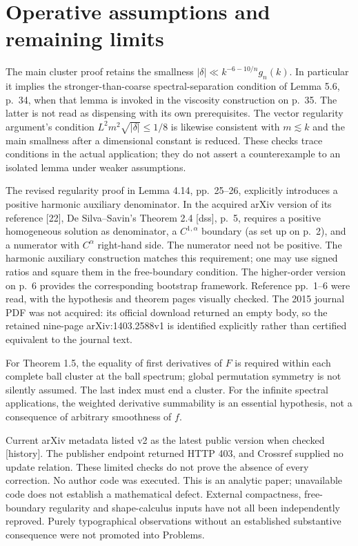 \documentclass[10pt]{article}
\begin{document}
\section*{Operative assumptions and remaining limits}
The main cluster proof retains the smallness \(|\delta|\ll k^{-6-10/n}g_n(k)\). In particular it implies the stronger-than-coarse spectral-separation condition of Lemma 5.6, p. 34, when that lemma is invoked in the viscosity construction on p. 35. The latter is not read as dispensing with its own prerequisites. The vector regularity argument’s condition \(L^2m^2\sqrt{|\delta|}\leq1/8\) is likewise consistent with \(m\lesssim k\) and the main smallness after a dimensional constant is reduced. These checks trace conditions in the actual application; they do not assert a counterexample to an isolated lemma under weaker assumptions.\par
The revised regularity proof in Lemma 4.14, pp. 25–26, explicitly introduces a positive harmonic auxiliary denominator. In the acquired arXiv version of its reference [22], De Silva–Savin’s Theorem 2.4 [dss], p. 5, requires a positive homogeneous solution as denominator, a \(C^{1,\alpha}\) boundary (as set up on p. 2), and a numerator with \(C^\alpha\) right-hand side. The numerator need not be positive. The harmonic auxiliary construction matches this requirement; one may use signed ratios and square them in the free-boundary condition. The higher-order version on p. 6 provides the corresponding bootstrap framework. Reference pp. 1–6 were read, with the hypothesis and theorem pages visually checked. The 2015 journal PDF was not acquired: its official download returned an empty body, so the retained nine-page arXiv:1403.2588v1 is identified explicitly rather than certified equivalent to the journal text.\par
For Theorem 1.5, the equality of first derivatives of \(F\) is required within each complete ball cluster at the ball spectrum; global permutation symmetry is not silently assumed. The last index must end a cluster. For the infinite spectral applications, the weighted derivative summability is an essential hypothesis, not a consequence of arbitrary smoothness of \(f\).\par
Current arXiv metadata listed v2 as the latest public version when checked [history]. The publisher endpoint returned HTTP 403, and Crossref supplied no update relation. These limited checks do not prove the absence of every correction. No author code was executed. This is an analytic paper; unavailable code does not establish a mathematical defect. External compactness, free-boundary regularity and shape-calculus inputs have not all been independently reproved. Purely typographical observations without an established substantive consequence were not promoted into Problems.\par
\end{document}
